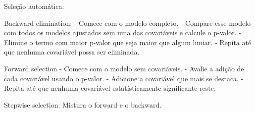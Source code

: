 Seleção automática:

Backward elimination:
  - Comece com o modelo completo.
  - Compare esse modelo com todos os modelos ajustados sem uma das covariáveis e calcule o p-valor.
  - Elimine o termo com maior p-valor que seja maior que algum limiar.
  - Repita até que nenhuma covariável possa ser eliminada.

Forward selection
  - Comece com o modelo sem covariáveis.
  - Avalie a adição de cada covariável usando o p-valor.
  - Adicione a covariável que mais se destaca.
  - Repita até que nenhuma covariável estatísticamente significante reste.

Stepwise selection: Mistura o forward e o backward.

